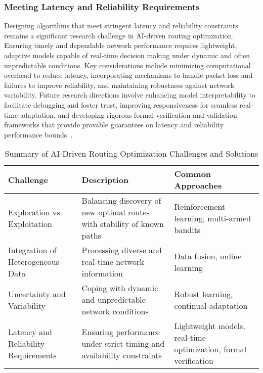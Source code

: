 \documentclass[sigconf]{acmart}
\begin{document}
\subsubsection{Meeting Latency and Reliability Requirements}

Designing algorithms that meet stringent latency and reliability constraints remains a significant research challenge in AI-driven routing optimization. Ensuring timely and dependable network performance requires lightweight, adaptive models capable of real-time decision making under dynamic and often unpredictable conditions. Key considerations include minimizing computational overhead to reduce latency, incorporating mechanisms to handle packet loss and failures to improve reliability, and maintaining robustness against network variability. Future research directions involve enhancing model interpretability to facilitate debugging and foster trust, improving responsiveness for seamless real-time adaptation, and developing rigorous formal verification and validation frameworks that provide provable guarantees on latency and reliability performance bounds~\cite{}.

\begin{table*}[htbp]
\centering
\caption{Summary of AI-Driven Routing Optimization Challenges and Solutions}
\label{tab:ai_routing_challenges}
\begin{adjustbox}{max width=\textwidth}
\begin{tabular}{@{}lll@{}}
\toprule
\textbf{Challenge}                         & \textbf{Description}                                                      & \textbf{Common Approaches}                      \\ \midrule
Exploration vs. Exploitation               & Balancing discovery of new optimal routes with stability of known paths  & Reinforcement learning, multi-armed bandits    \\
Integration of Heterogeneous Data          & Processing diverse and real-time network information                      & Data fusion, online learning                     \\
Uncertainty and Variability                & Coping with dynamic and unpredictable network conditions                  & Robust learning, continual adaptation            \\
Latency and Reliability Requirements       & Ensuring performance under strict timing and availability constraints    & Lightweight models, real-time optimization, formal verification \\ \bottomrule
\end{tabular}
\end{adjustbox}
\end{table*}
\end{document}
